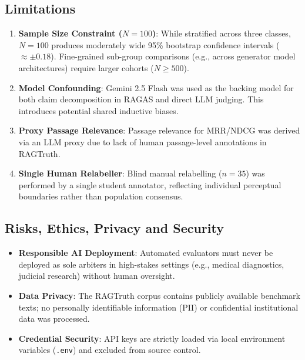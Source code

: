 \documentclass[11pt,a4paper]{article}
\begin{document}
\subsection{Limitations}
\begin{enumerate}[leftmargin=*]
    \item \textbf{Sample Size Constraint ($N=100$)}: While stratified across three classes, $N=100$ produces moderately wide 95\% bootstrap confidence intervals ($\approx \pm 0.18$). Fine-grained sub-group comparisons (e.g., across generator model architectures) require larger cohorts ($N \ge 500$).
    \item \textbf{Model Confounding}: Gemini 2.5 Flash was used as the backing model for both claim decomposition in RAGAS and direct LLM judging. This introduces potential shared inductive biases.
    \item \textbf{Proxy Passage Relevance}: Passage relevance for MRR/NDCG was derived via an LLM proxy due to lack of human passage-level annotations in RAGTruth.
    \item \textbf{Single Human Relabeller}: Blind manual relabelling ($n=35$) was performed by a single student annotator, reflecting individual perceptual boundaries rather than population consensus.
\end{enumerate}

\subsection{Risks, Ethics, Privacy and Security}
\begin{itemize}[leftmargin=*]
    \item \textbf{Responsible AI Deployment}: Automated evaluators must never be deployed as sole arbiters in high-stakes settings (e.g., medical diagnostics, judicial research) without human oversight.
    \item \textbf{Data Privacy}: The RAGTruth corpus contains publicly available benchmark texts; no personally identifiable information (PII) or confidential institutional data was processed.
    \item \textbf{Credential Security}: API keys are strictly loaded via local environment variables (\texttt{.env}) and excluded from source control.
\end{itemize}

\end{document}
